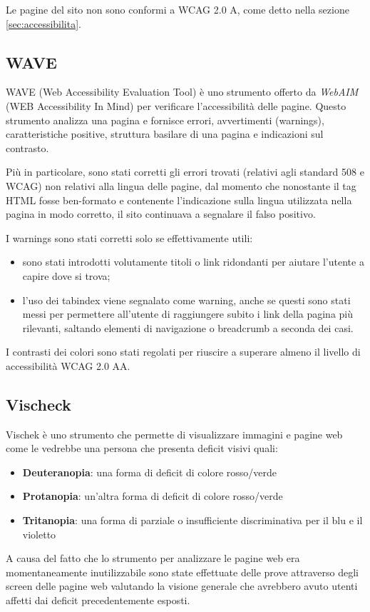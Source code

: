 Le pagine del sito non sono conformi a WCAG 2.0 A, come detto nella sezione
\ref{sec:accessibilita}.

\subsection{WAVE}
WAVE (Web Accessibility Evaluation Tool) è uno strumento offerto da
\textit{WebAIM} (WEB Accessibility In Mind) per verificare l'accessibilità
delle pagine. Questo strumento analizza una pagina e fornisce errori,
avvertimenti (warnings), caratteristiche positive, struttura basilare di una
pagina e indicazioni sul contrasto.

Più in particolare, sono stati corretti gli errori trovati (relativi agli
standard 508 e WCAG) non relativi alla lingua delle pagine, dal momento che
nonostante il tag HTML fosse ben-formato e contenente l'indicazione sulla
lingua utilizzata nella pagina in modo corretto, il sito continuava a
segnalare il falso positivo.

I warnings sono stati corretti solo se effettivamente utili:
\begin{itemize}
\item sono stati introdotti volutamente titoli o link ridondanti per
aiutare l'utente a capire dove si trova;
\item l'uso dei tabindex viene segnalato come warning, anche se questi sono
stati messi per permettere all'utente di raggiungere subito i link della
pagina più rilevanti, saltando elementi di navigazione o breadcrumb a seconda
dei casi.
\end{itemize}

I contrasti dei colori sono stati regolati per riuscire a superare almeno il
livello di accessibilità WCAG 2.0 AA.

\subsection{Vischeck}
Vischek è uno strumento che permette di visualizzare immagini e pagine web
come le vedrebbe una persona che presenta deficit visivi quali:
\begin{itemize}
\item \textbf{Deuteranopia}: una forma di deficit di colore rosso/verde
\item \textbf{Protanopia}: un'altra forma di deficit di colore rosso/verde
\item \textbf{Tritanopia}: una forma di parziale o insufficiente
discriminativa per il blu e il violetto
\end{itemize}
A causa del fatto che lo strumento per analizzare le pagine web era momentaneamente inutilizzabile sono state effettuate delle prove attraverso degli screen delle pagine web
valutando la visione generale che avrebbero avuto utenti affetti dai deficit precedentemente
esposti.

